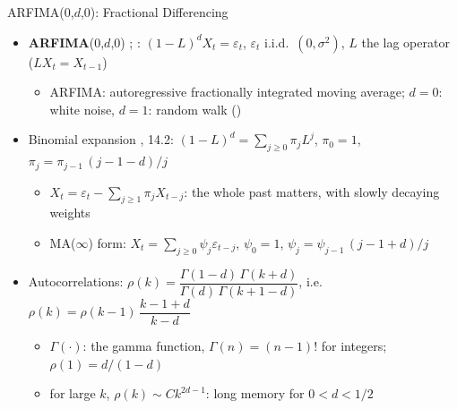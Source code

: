 \begin{frame}{ARFIMA(0,$d$,0): Fractional Differencing}
\itemsize{\footnotesize}
\begin{itemize}
    \item \textbf{ARFIMA}(0,$d$,0) ; : $(1 - L)^d X_t = \varepsilon_t$, $\varepsilon_t$ i.i.d.\ $(0, \sigma^2)$, $L$ the lag operator ($L X_t = X_{t-1}$)
    \begin{itemize}
        \item ARFIMA: autoregressive fractionally integrated moving average; $d = 0$: white noise, $d = 1$: random walk ()
    \end{itemize}
    \item Binomial expansion , 14.2: $(1 - L)^d = \sum_{j \ge 0} \pi_j L^j$, $\pi_0 = 1$, $\pi_j = \pi_{j-1}\,(j - 1 - d)/j$
    \begin{itemize}
        \item $X_t = \varepsilon_t - \sum_{j \ge 1}\pi_j X_{t-j}$: the whole past matters, with slowly decaying weights
        \item MA($\infty$) form: $X_t = \sum_{j \ge 0}\psi_j\varepsilon_{t-j}$, $\psi_0 = 1$, $\psi_j = \psi_{j-1}\,(j - 1 + d)/j$
    \end{itemize}
    \item Autocorrelations: $\rho(k) = \dfrac{\Gamma(1 - d)\,\Gamma(k + d)}{\Gamma(d)\,\Gamma(k + 1 - d)}$, i.e.\ $\rho(k) = \rho(k - 1)\,\dfrac{k - 1 + d}{k - d}$
    \begin{itemize}
        \item $\Gamma(\cdot)$: the gamma function, $\Gamma(n) = (n - 1)!$ for integers; $\rho(1) = d/(1 - d)$
        \item for large $k$, $\rho(k) \sim C k^{2d - 1}$: long memory for $0 < d < 1/2$
    \end{itemize}
\end{itemize}
\end{frame}

